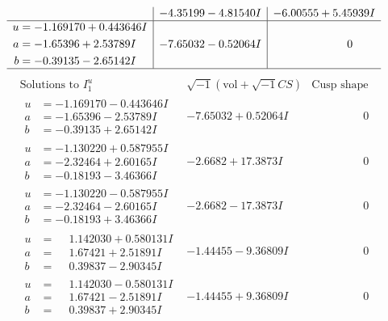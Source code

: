 \documentclass[1p]{elsarticle_modified}
\theoremstyle{definition}
\newcommand{\I}{\sqrt{-1}}
\begin{document}
$$\begin{array}{c|c|c}
 & -4.35199 - 4.81540 I & -6.00555 + 5.45939 I \\ \hline\begin{aligned}
u &= -1.169170 + 0.443646 I \\
a &= -1.65396 + 2.53789 I \\
b &= -0.39135 - 2.65142 I\end{aligned}
 & -7.65032 - 0.52064 I & \phantom{-0.000000 } 0\\
 \hline 
 \end{array}$$\newpage$$\begin{array}{c|c|c}  
\text{Solutions to }I^u_{1}& \I (\text{vol} + \sqrt{-1}CS) & \text{Cusp shape}\\
 \hline 
\begin{aligned}
u &= -1.169170 - 0.443646 I \\
a &= -1.65396 - 2.53789 I \\
b &= -0.39135 + 2.65142 I\end{aligned}
 & -7.65032 + 0.52064 I & \phantom{-0.000000 } 0 \\ \hline\begin{aligned}
u &= -1.130220 + 0.587955 I \\
a &= -2.32464 + 2.60165 I \\
b &= -0.18193 - 3.46366 I\end{aligned}
 & -2.6682 + 17.3873 I & \phantom{-0.000000 } 0 \\ \hline\begin{aligned}
u &= -1.130220 - 0.587955 I \\
a &= -2.32464 - 2.60165 I \\
b &= -0.18193 + 3.46366 I\end{aligned}
 & -2.6682 - 17.3873 I & \phantom{-0.000000 } 0 \\ \hline\begin{aligned}
u &= \phantom{-}1.142030 + 0.580131 I \\
a &= \phantom{-}1.67421 + 2.51891 I \\
b &= \phantom{-}0.39837 - 2.90345 I\end{aligned}
 & -1.44455 - 9.36809 I & \phantom{-0.000000 } 0 \\ \hline\begin{aligned}
u &= \phantom{-}1.142030 - 0.580131 I \\
a &= \phantom{-}1.67421 - 2.51891 I \\
b &= \phantom{-}0.39837 + 2.90345 I\end{aligned}
 & -1.44455 + 9.36809 I & \phantom{-0.000000 } 0 \\ \hline\begin{aligned}

\end{aligned}
\end{array}$$
\end{document}

